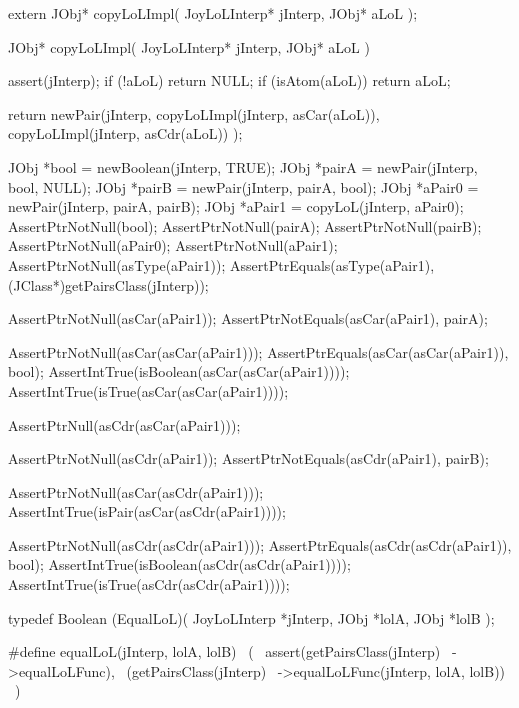\startCHeader
extern JObj* copyLoLImpl(
  JoyLoLInterp* jInterp,
  JObj* aLoL
);
\stopCHeader
{}

\startCCode
JObj* copyLoLImpl(
  JoyLoLInterp* jInterp,
  JObj* aLoL
) {
  assert(jInterp);
  if (!aLoL) return NULL;
  if (isAtom(aLoL)) return aLoL;

  return newPair(jInterp,
                 copyLoLImpl(jInterp, asCar(aLoL)),
                 copyLoLImpl(jInterp, asCdr(aLoL))
                 );
}
\stopCCode


\startCTest
  JObj *bool   = newBoolean(jInterp, TRUE);
  JObj *pairA  = newPair(jInterp, bool, NULL);
  JObj *pairB  = newPair(jInterp, pairA, bool);
  JObj *aPair0 = newPair(jInterp, pairA, pairB);
  JObj *aPair1 = copyLoL(jInterp, aPair0);
  AssertPtrNotNull(bool);
  AssertPtrNotNull(pairA);
  AssertPtrNotNull(pairB);
  AssertPtrNotNull(aPair0);
  AssertPtrNotNull(aPair1);
  AssertPtrNotNull(asType(aPair1));
  AssertPtrEquals(asType(aPair1),
    (JClass*)getPairsClass(jInterp));

  AssertPtrNotNull(asCar(aPair1));
  AssertPtrNotEquals(asCar(aPair1), pairA);

  AssertPtrNotNull(asCar(asCar(aPair1)));
  AssertPtrEquals(asCar(asCar(aPair1)), bool);
  AssertIntTrue(isBoolean(asCar(asCar(aPair1))));
  AssertIntTrue(isTrue(asCar(asCar(aPair1))));

  AssertPtrNull(asCdr(asCar(aPair1)));

  AssertPtrNotNull(asCdr(aPair1));
  AssertPtrNotEquals(asCdr(aPair1), pairB);

  AssertPtrNotNull(asCar(asCdr(aPair1)));
  AssertIntTrue(isPair(asCar(asCdr(aPair1))));

  AssertPtrNotNull(asCdr(asCdr(aPair1)));
  AssertPtrEquals(asCdr(asCdr(aPair1)), bool);
  AssertIntTrue(isBoolean(asCdr(asCdr(aPair1))));
  AssertIntTrue(isTrue(asCdr(asCdr(aPair1))));
\stopCTest
\stopTestCase
\stopTestSuite

\startTestSuite[equalLoL]

\startCHeader
typedef Boolean (EqualLoL)(
  JoyLoLInterp *jInterp,
  JObj     *lolA,
  JObj     *lolB
);

#define equalLoL(jInterp, lolA, lolB)       \
  (                                         \
    assert(getPairsClass(jInterp)           \
      ->equalLoLFunc),                      \
    (getPairsClass(jInterp)                 \
      ->equalLoLFunc(jInterp, lolA, lolB))  \
  )

